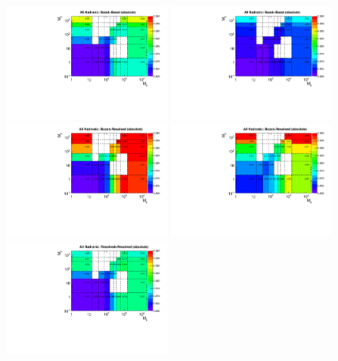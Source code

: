 \begin{figure}[htbp]
  \centering
  \includegraphics[width=0.48\textwidth]{figures/ttDM_S_allhad_2D_R08_bb.pdf}
  \includegraphics[width=0.48\textwidth]{figures/ttDM_PS_allhad_2D_R08_bb.pdf} \\
  \includegraphics[width=0.48\textwidth]{figures/ttDM_S_allhad_2D_R08_br.pdf}
  \includegraphics[width=0.48\textwidth]{figures/ttDM_PS_allhad_2D_R08_br.pdf} \\
  \includegraphics[width=0.48\textwidth]{figures/ttDM_S_allhad_2D_R08_rr.pdf}

\end{figure}
